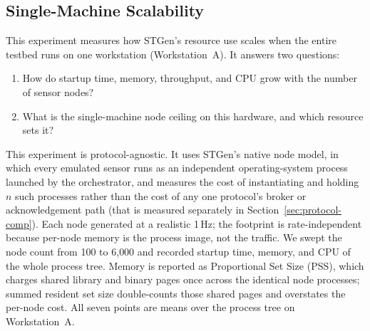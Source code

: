 \documentclass[jsan,article,submit,moreauthors,pdftex]{Definitions/mdpi}
\begin{document}
\subsection{Single-Machine Scalability}
\label{sec:scalability}
This experiment measures how STGen's resource use scales when the entire testbed runs on one workstation (Workstation~A). It answers two questions:
\begin{enumerate}
    \item How do startup time, memory, throughput, and CPU grow with the number of sensor nodes?
    \item What is the single-machine node ceiling on this hardware, and which resource sets it?
\end{enumerate}
This experiment is protocol-agnostic. It uses STGen's native node model, in which every emulated sensor runs as an independent operating-system process launched by the orchestrator, and measures the cost of instantiating and holding $n$ such processes rather than the cost of any one protocol's broker or acknowledgement path (that is measured separately in Section~\ref{sec:protocol-comp}). Each node generated at a realistic 1\,Hz; the footprint is rate-independent because per-node memory is the process image, not the traffic. We swept the node count from 100 to 6{,}000 and recorded startup time, memory, and CPU of the whole process tree. Memory is reported as Proportional Set Size (PSS), which charges shared library and binary pages once across the identical node processes; summed resident set size double-counts those shared pages and overstates the per-node cost. All seven points are means over the process tree on Workstation~A.

    
\end{document}
